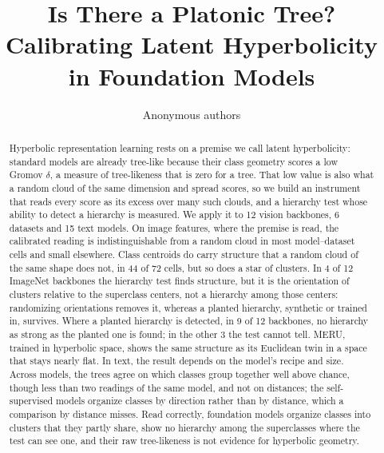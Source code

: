 \documentclass{article}
\title{Is There a Platonic Tree? \\ Calibrating Latent Hyperbolicity \\ in Foundation Models}
\author{Anonymous authors}
\makeatletter
\theoremstyle{inline}
\theoremstyle{inlineit}
\renewcommand\section{\@startsection{section}{1}{\z@}{-0.3ex plus -0.3ex minus -.2ex}{0.2ex plus 0.2ex minus 0.1ex}{\large\sc\raggedright}}
\makeatother
\begin{document}
\maketitle
\raggedbottom   %

\begin{abstract}
Hyperbolic representation learning rests on a premise we call latent hyperbolicity: standard models are already tree-like because their class geometry scores a low Gromov $\delta$, a measure of tree-likeness that is zero for a tree. That low value is also what a random cloud of the same dimension and spread scores, so we build an instrument that reads every score as its excess over many such clouds, and a hierarchy test whose ability to detect a hierarchy is measured. We apply it to 12 vision backbones, 6 datasets and 15 text models. On image features, where the premise is read, the calibrated reading is indistinguishable from a random cloud in most model--dataset cells and small elsewhere. Class centroids do carry structure that a random cloud of the same shape does not, in 44 of 72 cells, but so does a star of clusters. In 4 of 12 ImageNet backbones the hierarchy test finds structure, but it is the orientation of clusters relative to the superclass centers, not a hierarchy among those centers: randomizing orientations removes it, whereas a planted hierarchy, synthetic or trained in, survives. Where a planted hierarchy is detected, in 9 of 12 backbones, no hierarchy as strong as the planted one is found; in the other 3 the test cannot tell. MERU, trained in hyperbolic space, shows the same structure as its Euclidean twin in a space that stays nearly flat. In text, the result depends on the model's recipe and size. Across models, the trees agree on which classes group together well above chance, though less than two readings of the same model, and not on distances; the self-supervised models organize classes by direction rather than by distance, which a comparison by distance misses. Read correctly, foundation models organize classes into clusters that they partly share, show no hierarchy among the superclasses where the test can see one, and their raw tree-likeness is not evidence for hyperbolic geometry.
\end{abstract}

\section{Introduction}
\label{sec:introduction}
\end{document}

